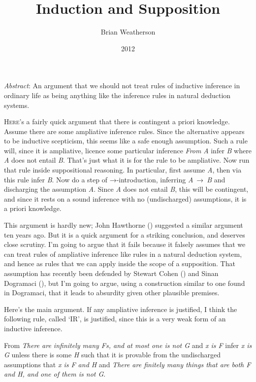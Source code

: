 \documentclass[
  11pt,
  letterpaper,
  DIV=11,
  numbers=noendperiod,
  twoside]{scrartcl}
\title{Induction and Supposition}
\author{Brian Weatherson}
\date{2012}
\providecommand{\tightlist}{%
  \setlength{\itemsep}{0pt}\setlength{\parskip}{0pt}}
\renewenvironment{abstract}
 {\vspace{-1.25cm}
 \quotation\small\noindent\emph{Abstract}:}
 {\endquotation}
\renewenvironment{abstract}
 {\quotation\small\noindent\emph{Abstract}:}
 {\endquotation\vspace{-0.02cm}}
\begin{document}
\maketitle
\begin{abstract}
An argument that we should not treat rules of inductive inference in
ordinary life as being anything like the inference rules in natural
deduction systems.
\end{abstract}


\lettrine{H}{ere}'s a fairly quick argument that there is contingent a
priori knowledge. Assume there are some ampliative inference rules.
Since the alternative appears to be inductive scepticism, this seems
like a safe enough assumption. Such a rule will, since it is ampliative,
licence some particular inference \emph{From} \emph{A} infer \emph{B}
where \emph{A} does not entail \emph{B}. That's just what it is for the
rule to be ampliative. Now run that rule inside suppositional reasoning.
In particular, first assume \emph{A}, then via this rule infer \emph{B}.
Now do a step of →-introduction, inferring \emph{A}~→~\emph{B} and
discharging the assumption \emph{A}. Since \emph{A} does not entail
\emph{B}, this will be contingent, and since it rests on a sound
inference with no (undischarged) assumptions, it is a priori knowledge.

This argument is hardly new; John Hawthorne
() suggested a similar argument ten
years ago. But it is a quick argument for a striking conclusion, and
deserves close scrutiny. I'm going to argue that it fails because it
falsely assumes that we can treat rules of ampliative inference like
rules in a natural deduction system, and hence as rules that we can
apply inside the scope of a supposition. That assumption has recently
been defended by Stewart Cohen () and
Sinan Dogramaci (), but I'm going to
argue, using a construction similar to one found in Dogramaci, that it
leads to absurdity given other plausible premises.

Here's the main argument. If any ampliative inference is justified, I
think the following rule, called `IR', is justified, since this is a
very weak form of an inductive inference.

\begin{description}
\tightlist
\item[IR]
From \emph{There are infinitely many Fs, and at most one is not G} and
\emph{x is F} infer \emph{x is G} unless there is some \emph{H} such
that it is provable from the undischarged assumptions that \emph{x is F
and H} and \emph{There are finitely many things that are both F and H,
and one of them is not G}.
\end{description}
\end{document}
